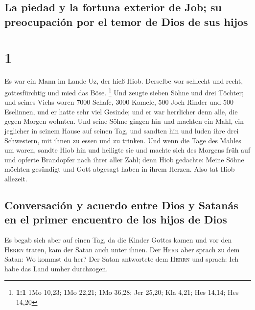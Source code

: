 \hypertarget{la-piedad-y-la-fortuna-exterior-de-job-su-preocupaciuxf3n-por-el-temor-de-dios-de-sus-hijos}{%
\subsection{La piedad y la fortuna exterior de Job; su preocupación por
el temor de Dios de sus
hijos}\label{la-piedad-y-la-fortuna-exterior-de-job-su-preocupaciuxf3n-por-el-temor-de-dios-de-sus-hijos}}

\hypertarget{section}{%
\section{1}\label{section}}

 Es war ein Mann im Lande Uz, der hieß Hiob. Derselbe war
schlecht und recht, gottesfürchtig und mied das Böse. \footnote{\textbf{1:1}
  1Mo 10,23; 1Mo 22,21; 1Mo 36,28; Jer 25,20; Kla 4,21; Hes 14,14; Hes
  14,20}  Und zeugte sieben Söhne und drei Töchter;
 und seines Viehs waren 7000 Schafe, 3000 Kamele, 500 Joch
Rinder und 500 Eselinnen, und er hatte sehr viel Gesinde; und er war
herrlicher denn alle, die gegen Morgen wohnten.  Und seine
Söhne gingen hin und machten ein Mahl, ein jeglicher in seinem Hause auf
seinen Tag, und sandten hin und luden ihre drei Schwestern, mit ihnen zu
essen und zu trinken.  Und wenn die Tage des Mahles um
waren, sandte Hiob hin und heiligte sie und machte sich des Morgens früh
auf und opferte Brandopfer nach ihrer aller Zahl; denn Hiob gedachte:
Meine Söhne möchten gesündigt und Gott abgesagt haben in ihrem Herzen.
Also tat Hiob allezeit.

\hypertarget{conversaciuxf3n-y-acuerdo-entre-dios-y-satanuxe1s-en-el-primer-encuentro-de-los-hijos-de-dios}{%
\subsection{Conversación y acuerdo entre Dios y Satanás en el primer
encuentro de los hijos de
Dios}\label{conversaciuxf3n-y-acuerdo-entre-dios-y-satanuxe1s-en-el-primer-encuentro-de-los-hijos-de-dios}}

 Es begab sich aber auf einen Tag, da die Kinder Gottes
kamen und vor den \textsc{Herrn} traten, kam der Satan auch unter ihnen.
 Der \textsc{Herr} aber sprach zu dem Satan: Wo kommst du
her? Der Satan antwortete dem \textsc{Herrn} und sprach: Ich habe das
Land umher durchzogen.

